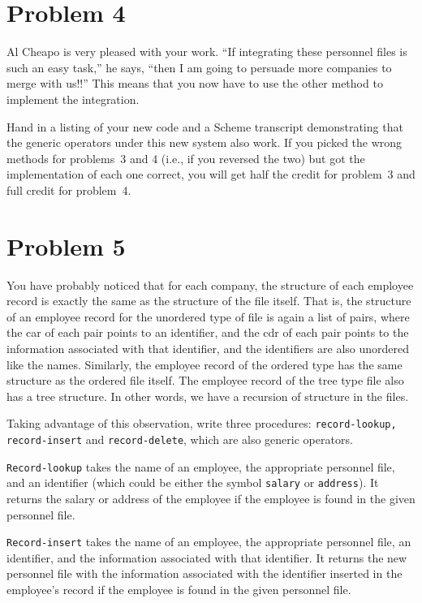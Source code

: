 \section{Problem 4}

Al Cheapo is very pleased with your work.  
``If integrating these personnel files is such an easy task,'' he says,
``then I am going to persuade more companies to merge with us!!''
This means that you now have to use the other method
to implement the integration.

Hand in a listing of your new code and a {\sc Scheme} transcript
demonstrating that the generic operators under this
new system also work.  If you picked the wrong methods
for problems~3 and 4 (i.e., if you reversed the two)
but got the implementation of each one correct, you
will get half the credit for problem~3 and full credit
for problem~4.

\section{Problem 5}

You have probably noticed that for each company, the
structure of each employee record is exactly the same
as the structure of the file itself.  That is, the
structure of an employee record for the unordered
type of file is again a list of pairs, where the
car of each pair points to an identifier, and the
cdr of each pair points to the information associated
with that identifier, and the identifiers are also
unordered like the names.  Similarly, the employee
record of the ordered type has the same structure as
the ordered file itself.  The employee record of
the tree type file also has a tree structure.
In other words, we have a recursion of structure
in the files.

Taking advantage of this observation,  write three
procedures: {\tt record-lookup, record-insert} and
{\tt record-delete}, which are also generic operators.

{\tt Record-lookup} takes the name of an employee, 
the appropriate personnel file, and an identifier
(which could be either the symbol {\tt salary} or
{\tt address}). It returns the salary or address of
the employee if the employee is found in the given
personnel file.

{\tt Record-insert} takes the name
of an employee, the appropriate personnel file,
an identifier, and the information associated
with that identifier. It returns the new
personnel file with the information associated
with the identifier inserted in the employee's
record if the employee is found in the
given personnel file.

